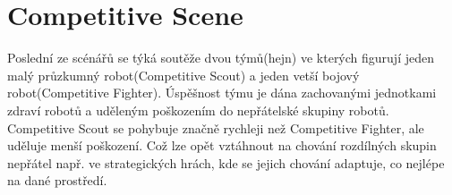 \section{Competitive Scene}
Poslední ze scénářů se týká soutěže dvou týmů(hejn) ve kterých figurují jeden malý průzkumný robot(Competitive Scout) a jeden vetší bojový robot(Competitive Fighter). Úspěšnost týmu je dána zachovanými jednotkami zdraví robotů a uděleným poškozením do nepřátelské skupiny robotů. Competitive Scout se pohybuje značně rychleji než Competitive Fighter, ale uděluje menší poškození. Což lze opět vztáhnout na chování rozdílných skupin nepřátel např. ve strategických hrách, kde se jejich chování adaptuje, co nejlépe na dané prostředí. 